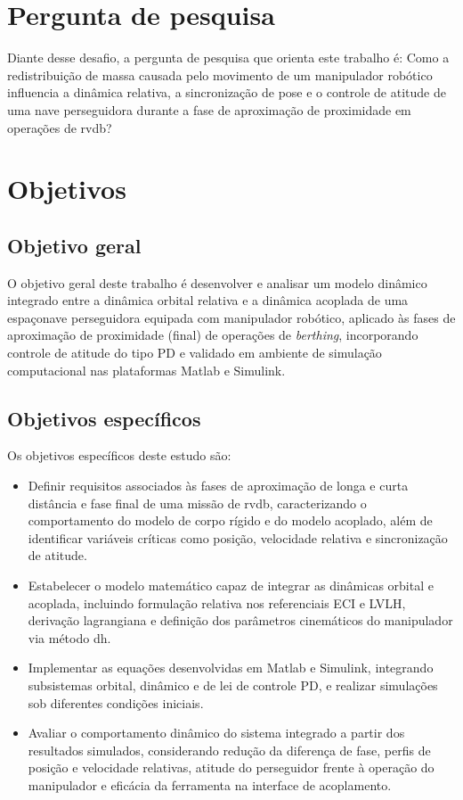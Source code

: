 \section{Pergunta de pesquisa}

Diante desse desafio, a pergunta de pesquisa que orienta este trabalho é: Como a redistribuição de massa causada pelo movimento de um manipulador robótico influencia a dinâmica relativa, a sincronização de pose e o controle de atitude de uma nave perseguidora durante a fase de aproximação de proximidade em operações de \gls{rvdb}?

\section{Objetivos}

\subsection{Objetivo geral}

O objetivo geral deste trabalho é desenvolver e analisar um modelo dinâmico integrado entre a dinâmica orbital relativa e a dinâmica acoplada de uma espaçonave perseguidora equipada com manipulador robótico, aplicado às fases de aproximação de proximidade (final) de operações de \textit{berthing}, incorporando controle de atitude do tipo PD e validado em ambiente de simulação computacional nas plataformas Matlab e Simulink.

\subsection{Objetivos específicos}

Os objetivos específicos deste estudo são:

\begin{itemize}
    \item Definir requisitos associados às fases de aproximação de longa e curta distância e fase final de uma missão de \gls{rvdb}, caracterizando o comportamento do modelo de corpo rígido e do modelo acoplado, além de identificar variáveis críticas como posição, velocidade relativa e sincronização de atitude.
    \item Estabelecer o modelo matemático capaz de integrar as dinâmicas orbital e acoplada, incluindo formulação relativa nos referenciais ECI e LVLH, derivação lagrangiana e definição dos parâmetros cinemáticos do manipulador via método \gls{dh}.
    \item Implementar as equações desenvolvidas em Matlab e Simulink, integrando subsistemas orbital, dinâmico e de lei de controle PD, e realizar simulações sob diferentes condições iniciais.
    \item Avaliar o comportamento dinâmico do sistema integrado a partir dos resultados simulados, considerando redução da diferença de fase, perfis de posição e velocidade relativas, atitude do perseguidor frente à operação do manipulador e eficácia da ferramenta na interface de acoplamento.
\end{itemize}

